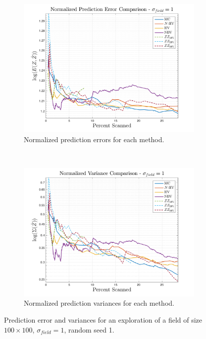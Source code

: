 \begin{figure}[htb!]
    \centering
    \begin{subfigure}[t]{0.75\textwidth}
        \centering
        \includegraphics[width=\linewidth]{figures/normalized_errors_30p_100x100_sf_1_seed_1_app_10}
        \captionsetup{skip=0.20\baselineskip,size=footnotesize}
        \caption{Normalized prediction errors for each method.}
    \end{subfigure}%
    \\
    \begin{subfigure}[t]{0.75\textwidth}
        \centering
        \includegraphics[width=\linewidth]{figures/normalized_variances_30p_100x100_sf_1_seed_1_app_10}
        \captionsetup{skip=0.20\baselineskip,size=footnotesize}
        \caption{Normalized prediction variances for each method.}
    \end{subfigure}%
    \captionsetup{skip=0.20\baselineskip}
    \caption{Prediction error and variances for an exploration of a field of size $100 \times 100$, $\sigma_{field} = 1$, random seed 1.}
    \label{fig:errvar1}
\end{figure}
\clearpage